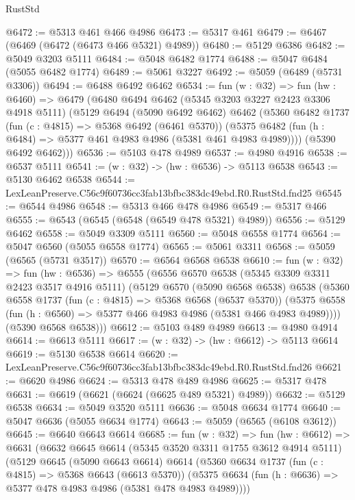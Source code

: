 \begin{lexlean}{RustStd}
\begin{coremodule}
@6472 := @5313 @461 @466 @4986
@6473 := @5317 @461
@6479 := @6467 (@6469 (@6472 (@6473 @466 @5321) @4989))
@6480 := @5129 @6386
@6482 := @5049 @3203 @5111
@6484 := @5048 @6482 @1774
@6488 := @5047 @6484 (@5055 @6482 @1774)
@6489 := @5061 @3227
@6492 := @5059 (@6489 (@5731 @3306))
@6494 := @6488 @6492 @6462
@6534 := fun (w : @32) =>
  fun (hw : @6460) =>
  @6479
    (@6480
      @6494
      @6462
      (@5345 @3203 @3227 @2423 @3306 @4918 @5111)
      (@5129
        @6494
        (@5090 @6492 @6462)
        @6462
        (@5360
          @6482
          @1737
          (fun (c : @4815) => @5368 @6492 (@6461 @5370))
          (@5375 @6482 (fun (h : @6484) => @5377 @461 @4983 @4986 (@5381 @461 @4983 @4989))))
        (@5390 @6492 @6462)))
@6536 := @5103 @478 @4989
@6537 := @4980 @4916
@6538 := @6537 @5111
@6541 := (w : @32) -> (hw : @6536) -> @5113 @6538
@6543 := @5130 @6462 @6538
@6544 := LexLeanPreserve.C56c9f60736cc3fab13bfbc383dc49ebd.R0.RustStd.fnd25
@6545 := @6544 @4986
@6548 := @5313 @466 @478 @4986
@6549 := @5317 @466
@6555 := @6543 (@6545 (@6548 (@6549 @478 @5321) @4989))
@6556 := @5129 @6462
@6558 := @5049 @3309 @5111
@6560 := @5048 @6558 @1774
@6564 := @5047 @6560 (@5055 @6558 @1774)
@6565 := @5061 @3311
@6568 := @5059 (@6565 (@5731 @3517))
@6570 := @6564 @6568 @6538
@6610 := fun (w : @32) =>
  fun (hw : @6536) =>
  @6555
    (@6556
      @6570
      @6538
      (@5345 @3309 @3311 @2423 @3517 @4916 @5111)
      (@5129
        @6570
        (@5090 @6568 @6538)
        @6538
        (@5360
          @6558
          @1737
          (fun (c : @4815) => @5368 @6568 (@6537 @5370))
          (@5375 @6558 (fun (h : @6560) => @5377 @466 @4983 @4986 (@5381 @466 @4983 @4989))))
        (@5390 @6568 @6538)))
@6612 := @5103 @489 @4989
@6613 := @4980 @4914
@6614 := @6613 @5111
@6617 := (w : @32) -> (hw : @6612) -> @5113 @6614
@6619 := @5130 @6538 @6614
@6620 := LexLeanPreserve.C56c9f60736cc3fab13bfbc383dc49ebd.R0.RustStd.fnd26
@6621 := @6620 @4986
@6624 := @5313 @478 @489 @4986
@6625 := @5317 @478
@6631 := @6619 (@6621 (@6624 (@6625 @489 @5321) @4989))
@6632 := @5129 @6538
@6634 := @5049 @3520 @5111
@6636 := @5048 @6634 @1774
@6640 := @5047 @6636 (@5055 @6634 @1774)
@6643 := @5059 (@6565 (@6108 @3612))
@6645 := @6640 @6643 @6614
@6685 := fun (w : @32) =>
  fun (hw : @6612) =>
  @6631
    (@6632
      @6645
      @6614
      (@5345 @3520 @3311 @1755 @3612 @4914 @5111)
      (@5129
        @6645
        (@5090 @6643 @6614)
        @6614
        (@5360
          @6634
          @1737
          (fun (c : @4815) => @5368 @6643 (@6613 @5370))
          (@5375 @6634 (fun (h : @6636) => @5377 @478 @4983 @4986 (@5381 @478 @4983 @4989))))

\end{coremodule}
\end{lexlean}
